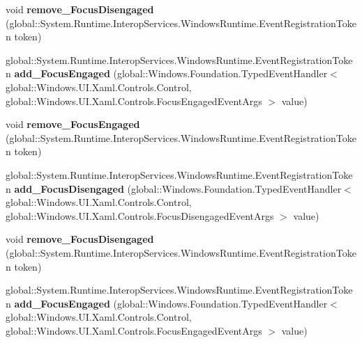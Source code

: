 \begin{DoxyCompactItemize}
void {\bfseries remove\+\_\+\+Focus\+Disengaged} (global\+::\+System.\+Runtime.\+Interop\+Services.\+Windows\+Runtime.\+Event\+Registration\+Token token)
\item 
\mbox{\label{interface_windows_1_1_u_i_1_1_xaml_1_1_controls_1_1_i_control4_aace904cbad444f4b1b7a2a18d9a214b9}} 
global\+::\+System.\+Runtime.\+Interop\+Services.\+Windows\+Runtime.\+Event\+Registration\+Token {\bfseries add\+\_\+\+Focus\+Engaged} (global\+::\+Windows.\+Foundation.\+Typed\+Event\+Handler$<$ global\+::\+Windows.\+U\+I.\+Xaml.\+Controls.\+Control, global\+::\+Windows.\+U\+I.\+Xaml.\+Controls.\+Focus\+Engaged\+Event\+Args $>$ value)
\item 
\mbox{\label{interface_windows_1_1_u_i_1_1_xaml_1_1_controls_1_1_i_control4_a382ea6b14878ea7b5e2b4ba178cd1018}} 
void {\bfseries remove\+\_\+\+Focus\+Engaged} (global\+::\+System.\+Runtime.\+Interop\+Services.\+Windows\+Runtime.\+Event\+Registration\+Token token)
\item 
\mbox{\label{interface_windows_1_1_u_i_1_1_xaml_1_1_controls_1_1_i_control4_a680a8edc30b4ba72807571ed0e1513ee}} 
global\+::\+System.\+Runtime.\+Interop\+Services.\+Windows\+Runtime.\+Event\+Registration\+Token {\bfseries add\+\_\+\+Focus\+Disengaged} (global\+::\+Windows.\+Foundation.\+Typed\+Event\+Handler$<$ global\+::\+Windows.\+U\+I.\+Xaml.\+Controls.\+Control, global\+::\+Windows.\+U\+I.\+Xaml.\+Controls.\+Focus\+Disengaged\+Event\+Args $>$ value)
\item 
\mbox{\label{interface_windows_1_1_u_i_1_1_xaml_1_1_controls_1_1_i_control4_ae123018ef2852af850d529f171eb60f3}} 
void {\bfseries remove\+\_\+\+Focus\+Disengaged} (global\+::\+System.\+Runtime.\+Interop\+Services.\+Windows\+Runtime.\+Event\+Registration\+Token token)
\item 
\mbox{\label{interface_windows_1_1_u_i_1_1_xaml_1_1_controls_1_1_i_control4_aace904cbad444f4b1b7a2a18d9a214b9}} 
global\+::\+System.\+Runtime.\+Interop\+Services.\+Windows\+Runtime.\+Event\+Registration\+Token {\bfseries add\+\_\+\+Focus\+Engaged} (global\+::\+Windows.\+Foundation.\+Typed\+Event\+Handler$<$ global\+::\+Windows.\+U\+I.\+Xaml.\+Controls.\+Control, global\+::\+Windows.\+U\+I.\+Xaml.\+Controls.\+Focus\+Engaged\+Event\+Args $>$ value)

\end{DoxyCompactItemize}
